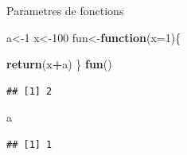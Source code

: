 \documentclass[
  ignorenonframetext,
]{beamer}
\newenvironment{Shaded}{\begin{snugshade}}{\end{snugshade}}
\newcommand{\ControlFlowTok}[1]{\textcolor[rgb]{0.13,0.29,0.53}{\textbf{#1}}}
\newcommand{\DataTypeTok}[1]{\textcolor[rgb]{0.13,0.29,0.53}{#1}}
\newcommand{\DecValTok}[1]{\textcolor[rgb]{0.00,0.00,0.81}{#1}}
\newcommand{\KeywordTok}[1]{\textcolor[rgb]{0.13,0.29,0.53}{\textbf{#1}}}
\newcommand{\NormalTok}[1]{#1}
\newcommand{\OperatorTok}[1]{\textcolor[rgb]{0.81,0.36,0.00}{\textbf{#1}}}
\begin{document}
\begin{frame}[fragile]{Parametres de fonctions}
\protect\hypertarget{parametres-de-fonctions-3}{}

\begin{Shaded}
\begin{Highlighting}[]
\NormalTok{a<-}\DecValTok{1}
\NormalTok{x<-}\DecValTok{100}
\NormalTok{fun<-}\ControlFlowTok{function}\NormalTok{(}\DataTypeTok{x=}\DecValTok{1}\NormalTok{)\{}

\KeywordTok{return}\NormalTok{(x}\OperatorTok{+}\NormalTok{a)}
\NormalTok{\}}
\KeywordTok{fun}\NormalTok{()}
\end{Highlighting}
\end{Shaded}

\begin{verbatim}
## [1] 2
\end{verbatim}

\begin{Shaded}
\begin{Highlighting}[]
\NormalTok{a}
\end{Highlighting}
\end{Shaded}

\begin{verbatim}
## [1] 1
\end{verbatim}

\end{frame}
\end{document}
